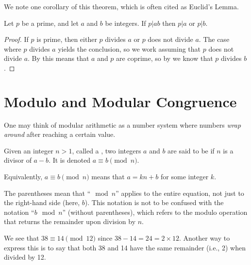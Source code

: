We note one corollary of this theorem, which is often cited as Euclid's Lemma.

\begin{corollary}\label{corollary-euclid}
    Let $p$ be a prime, and let $a$ and $b$ be integers. If $p \vert ab$ then $p \vert a$ or $p \vert b$.
\end{corollary}
\begin{proof}
    If $p$ is prime, then either $p$ divides $a$ or $p$ does not divide $a$. The case where $p$ divides $a$ yields the conclusion, so we work assuming that $p$ does not divide $a$. By  this means that $a$ and $p$ are coprime, so by  we know that $p$ divides $b$.
\end{proof}

\section{Modulo and Modular Congruence}
One may think of modular arithmetic as a number system where numbers \textit{wrap around} after reaching a certain value.

\begin{definition}
    Given an integer $n>1$, called a , two integers $a$ and $b$ are said to be  if $n$ is a divisor of $a - b$. It is denoted $a \equiv b \pmod{n}$.
\end{definition}
\begin{remark}
    Equivalently, $a \equiv b \pmod n$ means that $a = kn + b$ for some integer $k$.
\end{remark}
\begin{remark}
    The parentheses mean that ``$\mod{n}$'' applies to the entire equation, not just to the right-hand side (here, $b$). This notation is not to be confused with the notation ``$b \mod n$'' (without parentheses), which refers to the modulo operation that returns the remainder upon division by $n$.
\end{remark}

\begin{example}
    We see that $38 \equiv 14 \pmod{12}$ since $38 - 14 = 24 = 2 \times 12$. Another way to express this is to say that both 38 and 14 have the same remainder (i.e., 2) when divided by 12.
\end{example}

